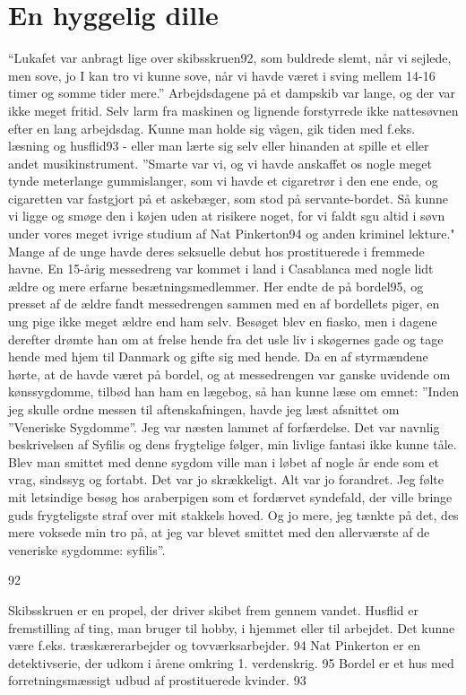\chapter{En hyggelig dille}\label{en-hyggelig-dille}

``Lukafet var anbragt lige over skibsskruen92, som buldrede slemt, når
vi sejlede, men sove, jo I kan tro vi kunne sove, når vi havde været i
sving mellem 14-16 timer og somme tider mere.'' Arbejdsdagene på et
dampskib var lange, og der var ikke meget fritid. Selv larm fra maskinen
og lignende forstyrrede ikke nattesøvnen efter en lang arbejdsdag. Kunne
man holde sig vågen, gik tiden med f.eks. læsning og husflid93 - eller
man lærte sig selv eller hinanden at spille et eller andet
musikinstrument. ''Smarte var vi, og vi havde anskaffet os nogle meget
tynde meterlange gummislanger, som vi havde et cigaretrør i den ene
ende, og cigaretten var fastgjort på et askebæger, som stod på
servante-bordet. Så kunne vi ligge og smøge den i køjen uden at risikere
noget, for vi faldt sgu altid i søvn under vores meget ivrige studium af
Nat Pinkerton94 og anden kriminel lekture." Mange af de unge havde deres
seksuelle debut hos prostituerede i fremmede havne. En 15-årig
messedreng var kommet i land i Casablanca med nogle lidt ældre og mere
erfarne besætningsmedlemmer. Her endte de på bordel95, og presset af de
ældre fandt messedrengen sammen med en af bordellets piger, en ung pige
ikke meget ældre end ham selv. Besøget blev en fiasko, men i dagene
derefter drømte han om at frelse hende fra det usle liv i skøgernes gade
og tage hende med hjem til Danmark og gifte sig med hende. Da en af
styrmændene hørte, at de havde været på bordel, og at messedrengen var
ganske uvidende om kønssygdomme, tilbød han ham en lægebog, så han kunne
læse om emnet: ''Inden jeg skulle ordne messen til aftenskafningen,
havde jeg læst afsnittet om ''Veneriske Sygdomme''. Jeg var næsten
lammet af forfærdelse. Det var navnlig beskrivelsen af Syfilis og dens
frygtelige følger, min livlige fantasi ikke kunne tåle. Blev man smittet
med denne sygdom ville man i løbet af nogle år ende som et vrag,
sindssyg og fortabt. Det var jo skrækkeligt. Alt var jo forandret. Jeg
følte mit letsindige besøg hos araberpigen som et fordærvet syndefald,
der ville bringe guds frygteligste straf over mit stakkels hoved. Og jo
mere, jeg tænkte på det, des mere voksede min tro på, at jeg var blevet
smittet med den allerværste af de veneriske sygdomme: syfilis''.

92

Skibsskruen er en propel, der driver skibet frem gennem vandet. Husflid
er fremstilling af ting, man bruger til hobby, i hjemmet eller til
arbejdet. Det kunne være f.eks. træskærerarbejder og tovværksarbejder.
94 Nat Pinkerton er en detektivserie, der udkom i årene omkring 1.
verdenskrig. 95 Bordel er et hus med forretningsmæssigt udbud af
prostituerede kvinder. 93


